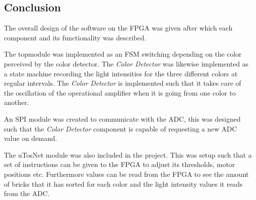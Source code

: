 
\subsection{Conclusion}
The overall design of the software on the FPGA was given after which each component and its functionality was described.

The topmodule was implemented as an FSM switching depending on the color perceived by the color detector.
The \textit{Color Detector} was likewise implemented as a state machine recording the light intensities for the three different colors at regular intervals.
The \textit{Color Detector} is implemented such that it takes care of the oscillation of the operational amplifier when it is going from one color to another.

An SPI module was created to communicate with the ADC, this was designed such that the \textit{Color Detector} component is capable of requesting a new ADC value on demand.

The uTosNet module was also included in the project.
This was setup such that a set of instructions can be given to the FPGA to adjust its thresholds, motor positions etc. 
Furthermore values can be read from the FPGA to see the amount of bricks that it has sorted for each color and the light intensity values it reads from the ADC.